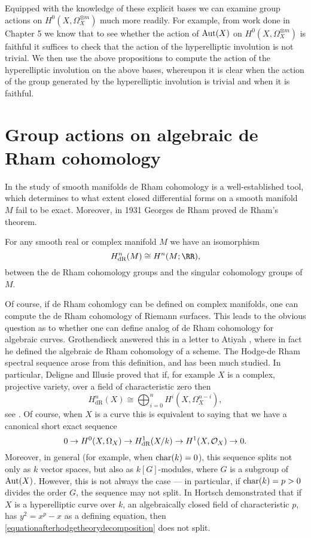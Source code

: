Equipped with the knowledge of these explicit bases we can examine group actions on $H^0(X,\Omega_X^{\otimes m})$ much more readily.
For example, from work done in Chapter 5 we know that to see whether the action of $\operatorname{Aut}(X)$ on $H^0(X,\Omega_X^{\otimes m})$ is faithful it suffices to check that the action of the hyperelliptic involution is not trivial.
We then use the above propositions to compute the action of the hyperelliptic involution on the above bases, whereupon it is clear when the action of the group generated by the hyperelliptic involution is trivial and when it is faithful.

\section{Group actions on algebraic de Rham cohomology}

In the study of smooth manifolds de Rham cohomology is a well-established tool, which determines to what extent closed differential forms on a smooth manifold $M$ fail to be exact.
Moreover, in 1931 Georges de Rham \cite{derhamstheorem} proved de Rham's theorem.
    \begin{unnumthm}
    For any smooth real or complex manifold $M$ we have an isomorphism
        \[
        H^n_{\text{dR}}(M) \cong H^n(M;\RR),
        \]
    between the de Rham cohomology groups and the singular cohomology groups of $M$.
    \end{unnumthm}

Of course, if de Rham cohomlogy can be defined on complex manifolds, one can compute the de Rham cohomology of Riemann surfaces.
This leads to the obvious question as to whether one can define analog of de Rham cohomology for algebraic curves.
Grothendieck answered this in a letter to Atiyah \cite{grothendiecklettertoatiyah}, where in fact he defined the algebraic de Rham cohomology of a scheme.
The Hodge-de Rham spectral sequence arose from this definition, and has been much studied.
In particular, Deligne and Illusie proved that if, for example $X$ is a complex, projective variety, over a field of characteristic zero then
    \begin{equation}\label{equationhodgetheorydecomposition}
    H^n_{\text{dR}}(X) \cong \bigoplus_{i=0}^n H^i(X,\Omega_X^{n-i}),
    \end{equation}
see \cite{deligneillusie}.
Of course, when $X$ is a curve this is equivalent to saying that we have a canonical short exact sequence
    \begin{equation}\label{equationafterhodgetheorydecomposition}
    0 \rightarrow {H^0(X,\Omega_X)} \rightarrow H_{\text {dR}}^1(X/k) \rightarrow H^1(X,\mathcal{O}_X) \rightarrow 0.
    \end{equation}
Moreover, in general (for example, when $\operatorname{char}(k) = 0$), this sequence splits not only as $k$ vector spaces, but also as $k[G]$-modules, where $G$ is a subgroup of $\operatorname{Aut}(X)$.
However, this is not always the case --- in particular, if $\operatorname{char}(k) = p >0$ divides the order $G$, the sequence may not split.
In \cite{hortsch} Hortsch demonstrated that if $X$ is a hyperelliptic curve over $k$, an algebraically closed field of characteristic $p$, has $y^2 = x^p-x$ as a defining equation, then \eqref{equationafterhodgetheorydecomposition} does not split.

